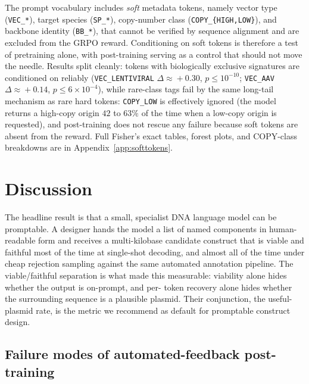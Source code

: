 \documentclass{article}
\begin{document}
The prompt vocabulary includes \emph{soft} metadata tokens, namely vector type
(\texttt{VEC\_*}), target species (\texttt{SP\_*}), copy-number class
(\texttt{COPY\_\{HIGH,LOW\}}), and backbone identity (\texttt{BB\_*}), that cannot be
verified by sequence alignment and are excluded from the GRPO reward. Conditioning on
soft tokens is therefore a test of pretraining alone, with post-training serving as a
control that should not move the needle. Results split cleanly: tokens with biologically
exclusive signatures are conditioned on reliably (\texttt{VEC\_LENTIVIRAL}
$\Delta\!\approx\!+0.30$, $p\!\leq\!10^{-10}$; \texttt{VEC\_AAV}
$\Delta\!\approx\!+0.14$, $p\!\leq\!6{\times}10^{-4}$), while rare-class tags fail by
the same long-tail mechanism as rare hard tokens: \texttt{COPY\_LOW} is effectively
ignored (the model returns a high-copy origin $42$ to $63\%$ of the time when a low-copy
origin is requested), and post-training does not rescue any failure because soft tokens
are absent from the reward. Full Fisher's exact tables, forest plots, and COPY-class
breakdowns are in Appendix~\ref{app:softtokens}.

\section{Discussion}
\label{sec:discussion}

The headline result is that a small, specialist DNA language model can be promptable.
A designer hands the model a list of named components in human-readable form and
receives a multi-kilobase candidate construct that is viable and faithful most of the
time at single-shot decoding, and almost all of the time under cheap rejection sampling
against the same automated annotation pipeline. The viable/faithful separation is what
made this measurable: viability alone hides whether the output is on-prompt, and per-
token recovery alone hides whether the surrounding sequence is a plausible plasmid.
Their conjunction, the useful-plasmid rate, is the metric we recommend as default for
promptable construct design.

\subsection{Failure modes of automated-feedback post-training}
\end{document}
